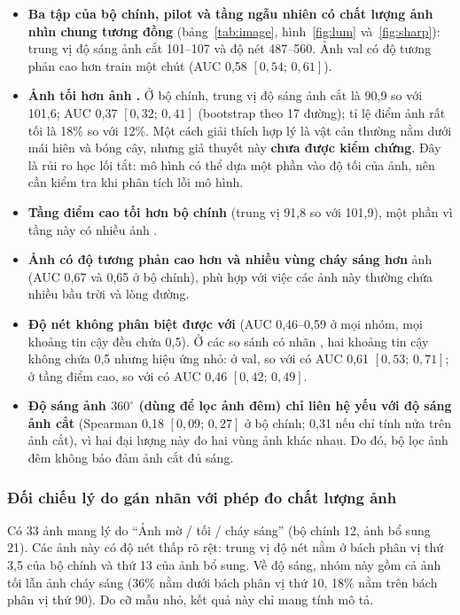 \begin{itemize}
  \item \textbf{Ba tập của bộ chính, pilot và tầng ngẫu nhiên có chất lượng ảnh nhìn chung tương đồng} (bảng~\ref{tab:image}, hình~\ref{fig:lum} và~\ref{fig:sharp}): trung vị độ sáng ảnh cắt 101--107 và độ nét 487--560. Ảnh val có độ tương phản cao hơn train một chút (AUC 0,58 $[0{,}54;\,0{,}61]$).
  \item \textbf{Ảnh  tối hơn ảnh .} Ở bộ chính, trung vị độ sáng ảnh cắt là 90,9 so với 101,6; AUC 0,37 $[0{,}32;\,0{,}41]$ (bootstrap theo 17 đường); tỉ lệ điểm ảnh rất tối là 18\% so với 12\%. Một cách giải thích hợp lý là vật cản thường nằm dưới mái hiên và bóng cây, nhưng giả thuyết này \textbf{chưa được kiểm chứng}. Đây là rủi ro học lối tắt: mô hình có thể dựa một phần vào độ tối của ảnh, nên cần kiểm tra khi phân tích lỗi mô hình.
  \item \textbf{Tầng điểm cao tối hơn bộ chính} (trung vị 91,8 so với 101,9), một phần vì tầng này có nhiều ảnh .
  \item \textbf{Ảnh  có độ tương phản cao hơn và nhiều vùng cháy sáng hơn} ảnh  (AUC 0,67 và 0,65 ở bộ chính), phù hợp với việc các ảnh này thường chứa nhiều bầu trời và lòng đường.
  \item \textbf{Độ nét không phân biệt được  với } (AUC 0,46--0,59 ở mọi nhóm, mọi khoảng tin cậy đều chứa 0,5). Ở các so sánh có nhãn , hai khoảng tin cậy không chứa 0,5 nhưng hiệu ứng nhỏ: ở val,  so với  có AUC 0,61 $[0{,}53;\,0{,}71]$; ở tầng điểm cao,  so với  có AUC 0,46 $[0{,}42;\,0{,}49]$.
  \item \textbf{Độ sáng ảnh $360^\circ$ (dùng để lọc ảnh đêm) chỉ liên hệ yếu với độ sáng ảnh cắt} (Spearman 0,18 $[0{,}09;\,0{,}27]$ ở bộ chính; 0,31 nếu chỉ tính nửa trên ảnh cắt), vì hai đại lượng này đo hai vùng ảnh khác nhau. Do đó, bộ lọc ảnh đêm không bảo đảm ảnh cắt đủ sáng.
\end{itemize}

\subsubsection*{Đối chiếu lý do gán nhãn  với phép đo chất lượng ảnh}

Có 33 ảnh  mang lý do ``Ảnh mờ / tối / cháy sáng'' (bộ chính 12, ảnh bổ sung 21). Các ảnh này có độ nét thấp rõ rệt: trung vị độ nét nằm ở bách phân vị thứ 3,5 của bộ chính và thứ 13 của ảnh bổ sung. Về độ sáng, nhóm này gồm cả ảnh tối lẫn ảnh cháy sáng (36\% nằm dưới bách phân vị thứ 10, 18\% nằm trên bách phân vị thứ 90). Do cỡ mẫu nhỏ, kết quả này chỉ mang tính mô tả.
